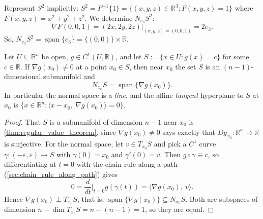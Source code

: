 \begin{example}
Represent $S^2$ implicitly: $S^2 = F^{-1}\{1\} = \{(x,y,z)\in\mathbb{R}^3 : F(x,y,z)=1\}$ where
$F(x,y,z) = x^2+y^2+z^2$. We determine $N_{e_3}S^2$:
\[\nabla F(0,0,1) = (2x,2y,2z)\big|_{(x,y,z)=(0,0,1)} = 2e_3.\]
So, $N_{e_3}S^2 = \operatorname{span}\{e_3\} = \{(0,0)\}\times\mathbb{R}$.
\end{example}

\begin{proposition}
\label{prop:gradient_orthogonality_level_sets}
Let $U \subseteq \mathbb{R}^n$ be open, $g \in C^1(U,\mathbb{R})$, and let
$S := \{x \in U : g(x) = c\}$ for some $c \in \mathbb{R}$. If $\nabla g(x_0) \neq 0$ at a point
$x_0 \in S$, then near $x_0$ the set $S$ is an $(n-1)$-dimensional submanifold and
\[N_{x_0}S = \operatorname{span}\{\nabla g(x_0)\}.\]
In particular the normal space is a \emph{line}, and the affine \emph{tangent} hyperplane to $S$
at $x_0$ is $\{x \in \mathbb{R}^n : \langle x - x_0,\ \nabla g(x_0)\rangle = 0\}$.
\end{proposition}

\begin{proof}
That $S$ is a submanifold of dimension $n-1$ near $x_0$ is \cref{thm:regular_value_theorem},
since $\nabla g(x_0) \neq 0$ says exactly that $Dg_{x_0} : \mathbb{R}^n \to \mathbb{R}$ is
surjective. For the normal space, let $v \in T_{x_0}S$ and pick a $C^1$ curve
$\gamma : (-\varepsilon,\varepsilon) \to S$ with $\gamma(0) = x_0$ and $\gamma'(0) = v$. Then
$g \circ \gamma \equiv c$, so differentiating at $t=0$ with the chain rule along a path
(\cref{sec:chain_rule_along_path}) gives
\[0 = \frac{d}{dt}\Big|_{t=0}g(\gamma(t)) = \big\langle \nabla g(x_0),\ v\big\rangle.\]
Hence $\nabla g(x_0) \perp T_{x_0}S$, that is,
$\operatorname{span}\{\nabla g(x_0)\} \subseteq N_{x_0}S$. Both are subspaces of dimension
$n - \dim T_{x_0}S = n-(n-1) = 1$, so they are equal.
\end{proof}

